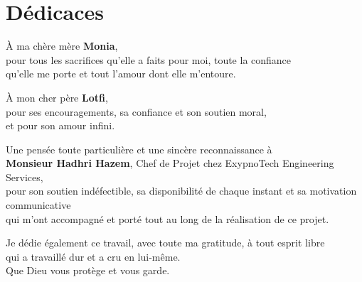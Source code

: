\documentclass[12pt,a4paper]{report}
\begin{document}
\pagestyle{plain}

\chapter*{Dédicaces}

\vspace{0.8cm}

\begin{center}
\begin{minipage}{0.85\textwidth}
\centering
\itshape

À ma chère mère \textbf{Monia},\\[2pt]
pour tous les sacrifices qu'elle a faits pour moi, toute la confiance\\
qu'elle me porte et tout l'amour dont elle m'entoure.

\vspace{0.9cm}

À mon cher père \textbf{Lotfi},\\[2pt]
pour ses encouragements, sa confiance et son soutien moral,\\
et pour son amour infini.

\vspace{0.9cm}

Une pensée toute particulière et une sincère reconnaissance à\\
\textbf{Monsieur Hadhri Hazem}, Chef de Projet chez ExypnoTech Engineering
Services,\\
pour son soutien indéfectible, sa disponibilité de chaque instant et sa
motivation communicative\\
qui m'ont accompagné et porté tout au long de la réalisation de ce projet.

\vspace{0.9cm}

Je dédie également ce travail, avec toute ma gratitude, à tout esprit libre\\
qui a travaillé dur et a cru en lui-même.\\
Que Dieu vous protège et vous garde.

\end{minipage}
\end{center}
\end{document}
